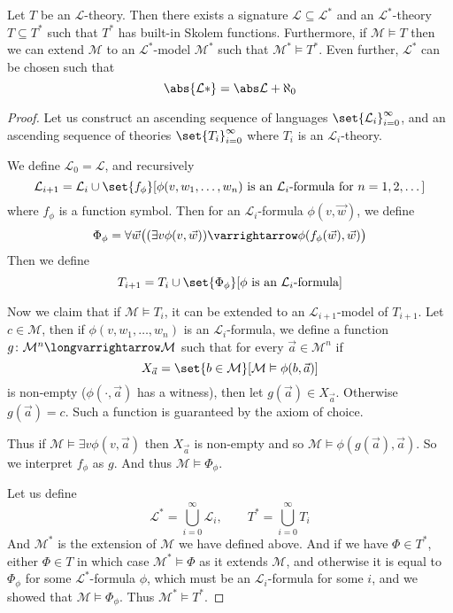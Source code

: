 \documentclass[10pt]{article}
\let\to=\varrightarrow
\let\longto=\longvarrightarrow
\def\mL{\mathcal{L}}
\def\mM{\mathcal{M}}
\begin{document}
\begin{lemm*}

    Let $T$ be an $\mL$-theory.
    Then there exists a signature $\mL\subseteq\mL^*$ and an $\mL^*$-theory $T\subseteq T^*$ such
    that $T^*$ has built-in Skolem functions.
    Furthermore, if $\mM\vDash T$ then we can extend $\mM$ to an $\mL^*$-model $\mM^*$ such that
    $\mM^*\vDash T^*$.
    Even further, $\mL^*$ can be chosen such that
    \[ \abs{\mL*} = \abs\mL + \aleph_0 \]

\end{lemm*}

\begin{proof}

    Let us construct an ascending sequence of languages $\set{\mL_i}_{i=0}^\infty$, and an
    ascending sequence of theories $\set{T_i}_{i=0}^\infty$ where $T_i$ is an $\mL_i$-theory.

    We define $\mL_0=\mL$, and recursively
    \[ \mL_{i+1} = \mL_i\cup\set{f_\phi}[\phi(v,w_1,\dots,w_n)\text{ is an }\mL_i\text{-formula for }
    n=1,2,\dots] \]
    where $f_\phi$ is a function symbol.
    Then for an $\mL_i$-formula $\phi(v,\vec w)$, we define
    \[ \Phi_\phi = \forall\vec w\bigl((\exists v\phi(v,\vec w))\to\phi(f_\phi(\vec w),\vec w)\bigr) \]
    Then we define
    \[ T_{i+1} = T_i\cup\set{\Phi_\phi}[\phi\text{ is an }\mL_i\text{-formula}] \]

    Now we claim that if $\mM\vDash T_i$, it can be extended to an $\mL_{i+1}$-model of $T_{i+1}$.
    Let $c\in\mM$, then if $\phi(v,w_1,\dots,w_n)$ is an $\mL_i$-formula, we define a function
    $g\colon\mM^n\longto\mM$ such that for every $\vec a\in\mM^n$ if
    \[ X_{\vec a} = \set{b\in\mM}[\mM\vDash\phi(b,\vec a)] \]
    is non-empty ($\phi(\cdot,\vec a)$ has a witness), then let $g(\vec a)\in X_{\vec a}$.
    Otherwise $g(\vec a)=c$.
    Such a function is guaranteed by the axiom of choice.

    Thus if $\mM\vDash\exists v\phi(v,\vec a)$ then $X_{\vec a}$ is non-empty and so
    $\mM\vDash\phi(g(\vec a),\vec a)$.
    So we interpret $f_\phi$ as $g$.
    And thus $\mM\vDash\Phi_\phi$.

    Let us define
    \[ \mL^* = \bigcup_{i=0}^\infty \mL_i,\qquad T^* = \bigcup_{i=0}^\infty T_i \]
    And $\mM^*$ is the extension of $\mM$ we have defined above.
    And if we have $\Phi\in T^*$, either $\Phi\in T$ in which case $\mM^*\vDash\Phi$ as it extends
    $\mM$, and otherwise it is equal to $\Phi_\phi$ for some $\mL^*$-formula $\phi$, which must be
    an $\mL_i$-formula for some $i$, and we showed that $\mM\vDash\Phi_\phi$.
    Thus $\mM^*\vDash T^*$.


\end{proof}
\end{document}
